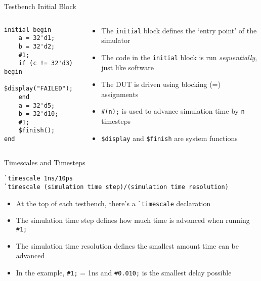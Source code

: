 \documentclass[12pt,aspectratio=169]{beamer}
\begin{document}
\begin{frame}[fragile]{Testbench Initial Block}
  \begin{columns}
    \begin{column}{0.5\textwidth}
      \begin{center}
        \begin{verbatim}
initial begin
    a = 32'd1;
    b = 32'd2;
    #1;
    if (c != 32'd3) begin
        $display("FAILED");
    end
    a = 32'd5;
    b = 32'd10;
    #1;
    $finish();
end
      \end{verbatim}
      \end{center}
    \end{column}
    \begin{column}{0.5\textwidth}
      \begin{itemize}
        \item The \verb|initial| block defines the `entry point' of the simulator
        \item The code in the \verb|initial| block is run \textit{sequentially}, just like software
        \item The DUT is driven using blocking (=) assignments
        \item \verb|#(n);| is used to advance simulation time by \verb|n| timesteps
        \item \verb|$display| and \verb|$finish| are system functions
      \end{itemize}
    \end{column}
  \end{columns}
\end{frame}

\begin{frame}[fragile]{Timescales and Timesteps}
  \begin{center}
    \begin{verbatim}
`timescale 1ns/10ps
`timescale (simulation time step)/(simulation time resolution)
    \end{verbatim}
    \begin{itemize}
      \item At the top of each testbench, there's a \verb|`timescale| declaration
      \item The simulation time step defines how much time is advanced when running \verb|#1;|
      \item The simulation time resolution defines the smallest amount time can be advanced
      \item In the example, \verb|#1;| = 1ns and \verb|#0.010;| is the smallest delay possible
    \end{itemize}
  \end{center}
\end{frame}
\end{document}
